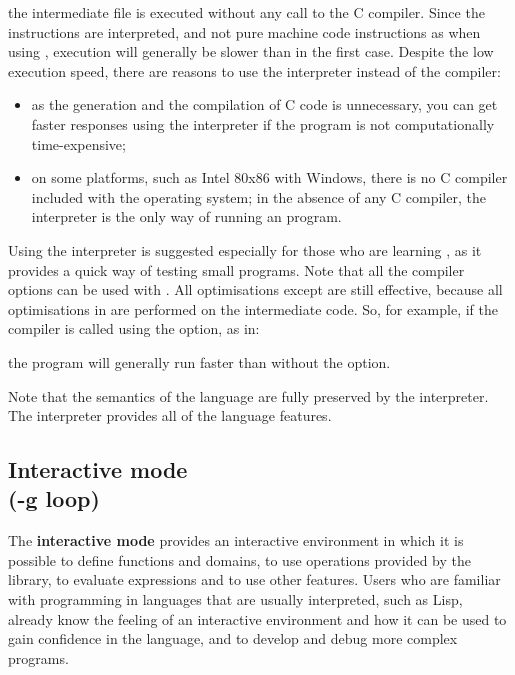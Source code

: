 \begin{small}
\osprompt {}
\end{small}

the intermediate file  is executed without any
call to the C compiler. Since the instructions are interpreted, and not
pure machine code instructions as when using , execution
will generally be slower than in the first case. Despite the
low execution speed, there are reasons to use the interpreter
instead of the compiler:

\begin{itemize}
\item as the generation and the compilation of C code is unnecessary,
you can get faster responses using the interpreter if the program is 
not computationally time-expensive;
\item on some platforms, such as Intel 80x86 with Windows, there is no C
compiler included  with the operating system; in the absence of any C
compiler, the interpreter is the only way
of running an \asharp{} program.
\end{itemize}

Using the interpreter is suggested especially for those who are
learning \asharp{}, as it provides a quick way of testing small
programs.  Note that all the compiler options can be used with
.
All optimisations except  are still effective, because
all optimisations in \asharp{} are
performed on the intermediate code. So, for example, if the compiler
is called using the  option, as in:

\begin{small}
\osprompt {}
\end{small}

the program will generally run faster than without the 
option.

Note that the semantics of the language are fully preserved by the
interpreter.  The interpreter provides all of the \asharp{} language
features.

\subsection{Interactive mode \\ (-g loop)}

The {\bf interactive mode} provides an interactive environment in which
it is possible to define functions and domains, to use operations
provided by the library, to evaluate expressions and to use other
features.  Users who are familiar with programming in languages that are
usually interpreted, such as Lisp, already know the feeling of an
interactive environment and how it can be used to gain confidence in the
language, and to develop and debug more complex programs.


